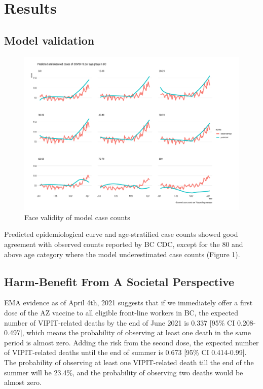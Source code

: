 \documentclass[]{interact}
\theoremstyle{plain}%
\theoremstyle{definition}
\theoremstyle{remark}
\begin{document}
\hypertarget{results}{%
\section{Results}\label{results}}

\hypertarget{model-validation}{%
\subsection{Model validation}\label{model-validation}}

\begin{figure}

{\centering \includegraphics[width=1\linewidth]{../figures/fig-validation} 

}

\caption{Face validity of model case counts}\label{fig:figValidation}
\end{figure}

Predicted epidemiological curve and age-stratified case counts showed
good agreement with observed counts reported by BC CDC, except for the
80 and above age category where the model underestimated case counts
(Figure 1).

\hypertarget{harm-benefit-from-a-societal-perspective}{%
\subsection{Harm-Benefit From A Societal
Perspective}\label{harm-benefit-from-a-societal-perspective}}

EMA evidence as of April 4th, 2021 suggests that if we immediately offer
a first dose of the AZ vaccine to all eligible front-line workers in BC,
the expected number of VIPIT-related deaths by the end of June 2021 is
0.337 {[}95\% CI 0.208-0.497{]}, which means the probability of
observing at least one death in the same period is almost zero. Adding
the risk from the second dose, the expected number of VIPIT-related
deaths until the end of summer is 0.673 {[}95\% CI 0.414-0.99{]}. The
probability of observing at least one VIPIT-related death till the end
of the summer will be 23.4\%, and the probability of observing two
deaths would be almost zero.
\end{document}
